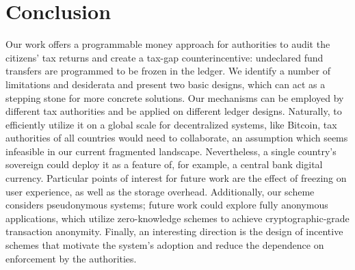 \section{Conclusion}\label{sec:conclusion}

Our work offers a programmable money 
approach for authorities to audit the citizens' tax returns and create
a tax-gap counterincentive: undeclared fund transfers are programmed to
be frozen in the ledger. We identify a number of limitations and
desiderata and present two basic designs, which can act as a stepping stone for
more concrete solutions. Our mechanisms can be employed by different tax
authorities and be applied on different ledger designs. Naturally, to
efficiently utilize it on a global scale for decentralized systems, like
Bitcoin, tax authorities of all countries would need to collaborate, an
assumption which seems infeasible in our current fragmented landscape.
Nevertheless, a single country's sovereign could deploy it as a feature of, for
example, a central bank digital currency.  Particular points of interest for
future work are the effect of freezing on user experience, as well as the
storage overhead. Additionally, our scheme considers pseudonymous systems;
future work could explore fully anonymous applications, which utilize
zero-knowledge schemes to achieve cryptographic-grade
transaction anonymity. Finally, an
interesting direction is the design of incentive schemes that motivate the
system's adoption and reduce the dependence on enforcement by the authorities.
